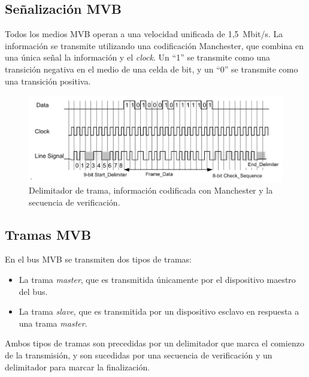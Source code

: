 \subsection{Señalización MVB}

Todos los medios MVB operan a una velocidad unificada de 1,5~Mbit/s.
La información se transmite utilizando una codificación Manchester, que combina en una única señal la información y el \textit{clock}.
Un ``1'' se transmite como una transición negativa en el medio de una celda de bit, y un ``0'' se transmite como una transición positiva.

\begin{figure}[htbp]
	\centering
	\includegraphics[width=1\textwidth]{./Figures/manchester.png}
	\caption[Delimitador de trama, información codificada con Manchester y la secuencia de verificación]{Delimitador de trama, información codificada con Manchester y la secuencia de verificación.
        \\ }
\end{figure}

\subsection{Tramas MVB}

En el bus MVB se transmiten dos tipos de tramas:

\begin{itemize}
\item La trama \textit{master}, que es transmitida únicamente por el dispositivo maestro del bus.
\item La trama \textit{slave}, que es transmitida por un dispositivo esclavo en respuesta a una trama \textit{master}.
\end{itemize}

Ambos tipos de tramas son precedidas por un delimitador que marca el comienzo de la transmisión, y son sucedidas por una secuencia de verificación y un delimitador para marcar la finalización.

